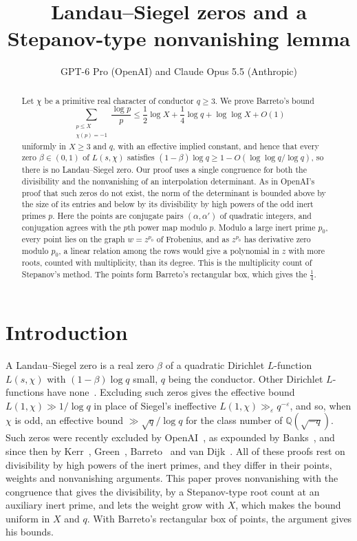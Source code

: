 \documentclass[11pt]{amsart}
\title[Landau--Siegel zeros and a Stepanov-type lemma]{Landau--Siegel zeros and a\\ Stepanov-type nonvanishing lemma}
\author[GPT-6 Pro and Claude Opus 5.5]{GPT-6 Pro (OpenAI) and Claude Opus 5.5 (Anthropic)}
\theoremstyle{remark}
\newcommand{\Q}{\mathbb{Q}}
\begin{document}
\begin{abstract}
Let $\chi$ be a primitive real character of conductor $q\ge3$. We prove Barreto's bound
\[
\sum_{\substack{p\le X\\ \chi(p)=-1}}\frac{\log p}p\le\frac12\log X+\frac14\log q+\log\log X+O(1)
\]
uniformly in $X\ge3$ and $q$, with an effective implied constant, and hence that every zero
$\beta\in(0,1)$ of $L(s,\chi)$ satisfies $(1-\beta)\log q\ge1-O(\log\log q/\log q)$, so there is no
Landau--Siegel zero. Our proof uses a single congruence for both the divisibility and the nonvanishing
of an interpolation determinant. As in OpenAI's proof that such zeros do not exist, the norm of the
determinant is bounded above by the size of its entries and below by its divisibility by high powers
of the odd inert primes $p$. Here the points are conjugate pairs $(\alpha,\alpha')$ of quadratic
integers, and conjugation agrees with the $p$th power map modulo $p$. Modulo a large inert prime $p_0$, every point lies on the
graph $w=z^{p_0}$ of Frobenius, and as $z^{p_0}$ has derivative zero modulo $p_0$, a linear relation
among the rows would give a polynomial in $z$ with more roots, counted with multiplicity, than its
degree. This is the multiplicity count of Stepanov's method. The points form Barreto's rectangular box,
which gives the $\frac14$.
\end{abstract}

\maketitle

\section{Introduction}

A Landau--Siegel zero is a real zero $\beta$ of a quadratic Dirichlet $L$-function $L(s,\chi)$ with
$(1-\beta)\log q$ small, $q$ being the conductor. Other Dirichlet $L$-functions have none~\cite[Ch.~14]{Davenport}.
Excluding such zeros gives the effective bound
$L(1,\chi)\gg1/\log q$ in place of Siegel's ineffective $L(1,\chi)\gg_\varepsilon q^{-\varepsilon}$, and so,
when $\chi$ is odd, an effective bound $\gg\sqrt q/\log q$ for the class number of $\Q(\sqrt{-q})$. Such zeros
were recently excluded by OpenAI~\cite{OpenAI}, as expounded by Banks~\cite{Banks}, and since then by Kerr~\cite{Kerr},
Green~\cite{Green}, Barreto~\cite{Barreto} and van Dijk~\cite{vanDijk}. All of these proofs rest on
divisibility by high powers of the inert primes, and they differ in their points, weights and
nonvanishing arguments.
This paper proves nonvanishing with the congruence that gives the divisibility, by a Stepanov-type
root count at an auxiliary inert prime, and lets the weight grow with $X$, which makes the bound uniform
in $X$ and $q$. With Barreto's rectangular box of points, the argument gives his bounds.
\end{document}

